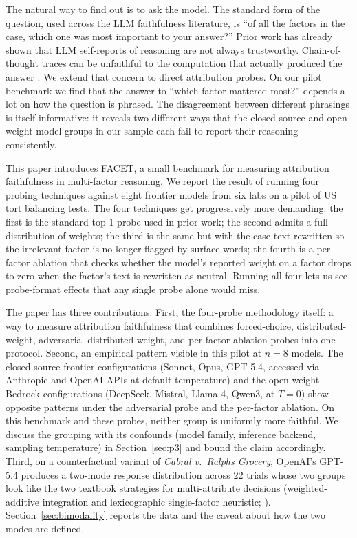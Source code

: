 \documentclass[11pt]{article}
\begin{document}
The natural way to find out is to ask the model. The standard form of the question, used across the LLM faithfulness literature, is ``of all the factors in the case, which one was most important to your answer?'' Prior work has already shown that LLM self-reports of reasoning are not always trustworthy. Chain-of-thought traces can be unfaithful to the computation that actually produced the answer \citep{turpin2023,lanham2023}. We extend that concern to direct attribution probes. On our pilot benchmark we find that the answer to ``which factor mattered most?'' depends a lot on how the question is phrased. The disagreement between different phrasings is itself informative: it reveals two different ways that the closed-source and open-weight model groups in our sample each fail to report their reasoning consistently.

This paper introduces FACET, a small benchmark for measuring attribution faithfulness in multi-factor reasoning. We report the result of running four probing techniques against eight frontier models from six labs on a pilot of US tort balancing tests. The four techniques get progressively more demanding: the first is the standard top-1 probe used in prior work; the second admits a full distribution of weights; the third is the same but with the case text rewritten so the irrelevant factor is no longer flagged by surface words; the fourth is a per-factor ablation that checks whether the model's reported weight on a factor drops to zero when the factor's text is rewritten as neutral. Running all four lets us see probe-format effects that any single probe alone would miss.

The paper has three contributions. First, the four-probe methodology itself: a way to measure attribution faithfulness that combines forced-choice, distributed-weight, adversarial-distributed-weight, and per-factor ablation probes into one protocol. Second, an empirical pattern visible in this pilot at $n = 8$ models. The closed-source frontier configurations (Sonnet, Opus, GPT-5.4, accessed via Anthropic and OpenAI APIs at default temperature) and the open-weight Bedrock configurations (DeepSeek, Mistral, Llama 4, Qwen3, at $T = 0$) show opposite patterns under the adversarial probe and the per-factor ablation. On this benchmark and these probes, neither group is uniformly more faithful. We discuss the grouping with its confounds (model family, inference backend, sampling temperature) in Section~\ref{sec:p3} and bound the claim accordingly. Third, on a counterfactual variant of \emph{Cabral v.\ Ralphs Grocery}, OpenAI's GPT-5.4 produces a two-mode response distribution across 22 trials whose two groups look like the two textbook strategies for multi-attribute decisions (weighted-additive integration and lexicographic single-factor heuristic; \citealt{payne1993}). Section~\ref{sec:bimodality} reports the data and the caveat about how the two modes are defined.
\end{document}
